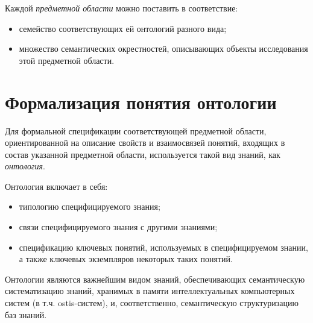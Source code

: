 Каждой \textit{предметной области} можно поставить в соответствие:
\begin{itemize}
	\item {семейство соответствующих ей онтологий разного вида};
	\item {множество семантических окрестностей, описывающих объекты исследования этой предметной области}.
\end{itemize}


\section{Формализация понятия онтологии}

Для формальной спецификации соответствующей предметной области,
ориентированной на описание свойств и взаимосвязей понятий, входящих в состав указанной предметной области, используется такой вид знаний, как \textit{онтология}.

\begin{SCn}
\end{SCn}

Онтология включает в себя:
\begin{itemize}
	\item {типологию специфицируемого знания};
	\item{связи специфицируемого знания с другими знаниями};
	\item{спецификацию ключевых понятий, используемых в специфицируемом знании, а также ключевых экземпляров некоторых таких понятий}.
\end{itemize}

Онтологии являются важнейшим видом знаний, обеспечивающих семантическую систематизацию знаний, хранимых в памяти интеллектуальных компьютерных систем (в т.ч. ostis-систем), и, соответственно, семантическую структуризацию баз знаний.

%